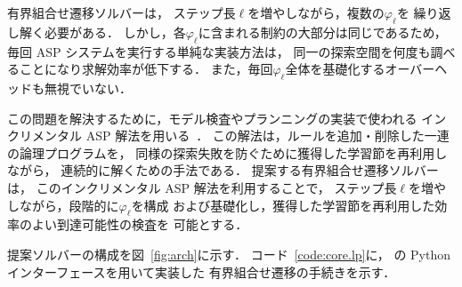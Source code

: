 有界組合せ遷移ソルバーは，
ステップ長$\ell$を増やしながら，複数の$\varphi_\ell$を
繰り返し解く必要がある．
しかし，各$\varphi_\ell$に含まれる制約の大部分は同じであるため，
毎回 ASP システムを実行する単純な実装方法は，
同一の探索空間を何度も調べることになり求解効率が低下する．
また，毎回$\varphi_\ell$全体を基礎化するオーバーヘッドも無視でいない．

この問題を解決するために，モデル検査やプランニングの実装で使われる
インクリメンタル ASP 解法を用いる~\cite{GebserKKS19}．
この解法は，ルールを追加・削除した一連の論理プログラムを，
同様の探索失敗を防ぐために獲得した学習節を再利用しながら，
連続的に解くための手法である．
提案する有界組合せ遷移ソルバーは，
このインクリメンタル ASP 解法を利用することで，
ステップ長$\ell$を増やしながら，段階的に$\varphi_\ell$を構成
および基礎化し，獲得した学習節を再利用した効率のよい到達可能性の検査を
可能とする．

提案ソルバーの構成を図~\ref{fig:arch}に示す．
コード~\ref{code:core.lp}に，
{\clingo}の Python インターフェースを用いて実装した
有界組合せ遷移の手続きを示す．

